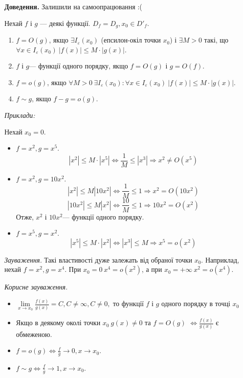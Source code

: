 \documentclass[12pt]{report}
\begin{document}
\textbf{Доведення.} Залишили на самоопрацювання :(

\vspace{5mm}

Нехай $f$ і $g$ --- деякі функції. $D_f = D_g, x_0 \in D'_f$.

\begin{enumerate}
    \item $f = O(g)$, якщо $\exists I_{\varepsilon}(x_0)$ (епсилон-окіл точки $x_0$) і $\exists M > 0$ такі, що $\forall x \in I_{\varepsilon}(x_0) \ |f(x)| \leq M \cdot |g(x)|$.
    \item $f$ і $g$--- функції одного порядку, якщо $f = O(g)$ і $g = O(f)$.
    \item $f = o(g)$, якщо $\forall M > 0 \ \exists I_{\varepsilon}(x_0) : \forall x \in I_{\varepsilon}(x_0) \ |f(x)| \leq M \cdot |g(x)|$.
    \item $f \sim g$, якщо $f - g = o(g)$.
\end{enumerate}

\textit{Приклади:}

Нехай $x_0 = 0$.

\begin{itemize}
    \item $f = x^2, g = x^5$. 
    $$|x^2| \leq M\cdot |x^5| \Longleftrightarrow \frac{1}{M} \leq |x^3| \Longrightarrow x^2 \neq O(x^5)$$
    \item $f = x^2, g = 10x^2$.
    $$|x^2| \leq M|10x^2| \Longleftrightarrow \frac{1}{M} \leq 1 \Longrightarrow x^2 = O(10x^2)$$
    $$|10x^2| \leq M|x^2| \Longleftrightarrow \frac{10}{M} \leq 1 \Longrightarrow 10x^2 = O(x^2)$$
    Отже, $x^2$ і $10x^2$--- функції одного порядку.
    \item $f = x^5, g = x^2$.
    $$|x^5| \leq M\cdot |x^2| \Longleftrightarrow |x^3|\leq M \Longrightarrow x^5 = o(x^2)$$
\end{itemize}

\textit{Зауваження.} Такі властивості дуже залежать від обраної точки $x_0$. Наприклад, нехай $f = x^2, g = x^4$. При $x_0 = 0 \ x^4 = o(x^2)$, а при $x_0 = +\infty \ x^2 = o(x^4)$.

\vspace{5mm}

\textit{Корисне зауваження.} 
\begin{itemize}
    \item $\lim\limits_{x \to x_0}\frac{f(x)}{g(x)} = C, C \neq \infty, C \neq 0, \textrm{ то функції $f$ і $g$ одного порядку в точці $x_0$}$
    \item Якщо в деякому околі точки $x_0 \ g(x) \neq 0$ та $f = O(g)$ $\Longleftrightarrow \frac{f(x)}{g(x)}$ є обмеженою.
    \item $f = o(g) \Longleftrightarrow \frac{f}{g} \to 0, x \to x_0$.
    \item $f \sim g \Longleftrightarrow \frac{f}{g} \to 1, x \to x_0$.
\end{itemize}
\end{document}
